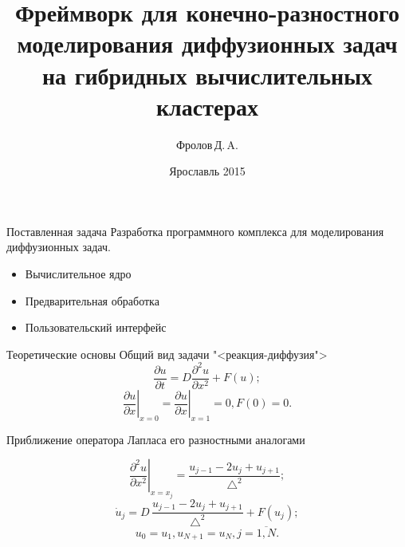 \documentclass{beamer}
\begin{document}
	\title[]{Фреймворк для конечно-разностного моделирования диффузионных задач на гибридных вычислительных кластерах}  
	\author{Фролов\,Д.\,A.}
	\date{Ярославль 2015} 
	\frame{\titlepage} 

\begin{frame}{Поставленная задача}
	Разработка программного комплекса для моделирования диффузионных задач.
	\begin{itemize}
		\item Вычислительное ядро
		\item Предварительная обработка
		\item Пользовательский интерфейс
	\end{itemize}
\end{frame}




\begin{frame}{Теоретические основы}
Общий вид задачи "<реакция-диффузия">
$$\frac{\partial u}{\partial t} = D \frac{\partial^2 u}{\partial x^2} + F(u);$$
$$\left.{\frac{\partial u}{\partial x}} \right|_{x=0} = \left.{\frac{\partial u}{\partial x}} \right|_{x=1} = 0, F(0) = 0.$$


Приближение оператора Лапласа его разностными аналогами

$$\left.{\frac{\partial^2 u}{\partial x^2}}\right|_{x=x_j} = \frac{u_{j-1} - 2u_j + u_{j+1}}{\bigtriangleup^2};$$
$$\dot u_j = D\, \frac{u_{j-1} - 2u_j + u_{j+1}}{\bigtriangleup^2} + F(u_j);$$
$$u_0 = u_1, u_{N+1} = u_N, j = \overline{1, N}.$$
\end{frame}
\end{document}
